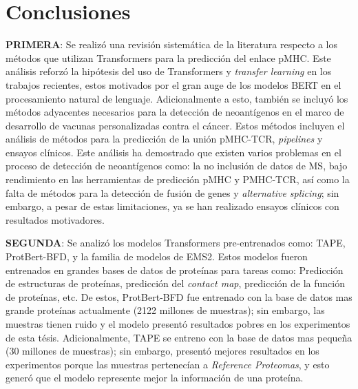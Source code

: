 \chapter{Conclusiones}
\label{cap:conclusiones}



\textbf{PRIMERA}: Se realizó una revisión sistemática de la literatura respecto a los métodos que utilizan Transformers para la predicción del enlace pMHC. Este análisis reforzó la hipótesis del uso de Transformers y \textit{transfer learning} en los trabajos  recientes, estos motivados por el gran auge de los modelos BERT en el procesamiento natural de lenguaje. Adicionalmente a esto, también se incluyó los métodos adyacentes necesarios para la detección de neoantígenos en el marco de desarrollo de vacunas personalizadas contra el cáncer. Estos métodos incluyen el análisis de métodos para la predicción de la unión pMHC-TCR, \textit{pipelines} y ensayos clínicos. Este análisis ha demostrado que existen varios problemas en el proceso de detección de neoantígenos como: la no inclusión de datos de MS, bajo rendimiento en las herramientas de predicción pMHC y PMHC-TCR, así como la falta de métodos para la detección de fusión de genes y \textit{alternative splicing}; sin embargo, a pesar de estas limitaciones, ya se han realizado ensayos clínicos con resultados motivadores.

\textbf{SEGUNDA}: Se analizó los modelos Transformers pre-entrenados como: TAPE, ProtBert-BFD, y la familia de modelos de EMS2. Estos modelos fueron entrenados en grandes bases de datos de proteínas para tareas como: Predicción de estructuras de proteínas, predicción del \textit{contact map}, predicción de la función de proteínas, etc. De estos, ProtBert-BFD fue entrenado con la base de datos mas grande proteínas actualmente (2122 millones de muestras); sin embargo, las muestras tienen ruido y  el modelo presentó resultados pobres en los experimentos de esta tésis. Adicionalmente, TAPE se entreno con la base de datos mas pequeña (30 millones de muestras); sin embargo, presentó mejores resultados en los experimentos porque las muestras pertenecían a \textit{Reference Proteomas}, y esto generó que el modelo represente mejor la información de una proteína.

